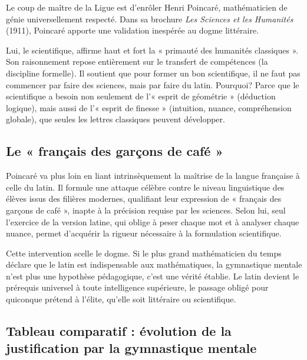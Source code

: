 Le coup de maître de la Ligue est d'enrôler Henri Poincaré, mathématicien de génie universellement
respecté. Dans sa brochure \textit{Les Sciences et les Humanités} (1911), Poincaré apporte une
validation inespérée au dogme littéraire.\cite{I-1-3-ref17}

Lui, le scientifique, affirme haut et fort la « primauté des humanités classiques ». Son
raisonnement repose entièrement sur le transfert de compétences (la discipline formelle). Il
soutient que pour former un bon scientifique, il ne faut pas commencer par faire des sciences, mais
par faire du latin. Pourquoi? Parce que le scientifique a besoin non seulement de l'« esprit de
géométrie » (déduction logique), mais aussi de l'« esprit de finesse » (intuition, nuance,
compréhension globale), que seules les lettres classiques peuvent développer.\cite{I-1-3-ref17}



\subsection{Le « français des garçons de café »}

Poincaré va plus loin en liant intrinsèquement la maîtrise de la langue française à celle du latin.
Il formule une attaque célèbre contre le niveau linguistique des élèves issus des filières modernes,
qualifiant leur expression de « français des garçons de café », inapte à la précision requise par
les sciences. Selon lui, seul l'exercice de la version latine, qui oblige à peser chaque mot et à
analyser chaque nuance, permet d'acquérir la rigueur nécessaire à la formulation
scientifique.\cite{I-1-3-ref17}

Cette intervention scelle le dogme. Si le plus grand mathématicien du temps déclare que le latin est
indispensable aux mathématiques, la gymnastique mentale n'est plus une hypothèse pédagogique, c'est
une vérité établie. Le latin devient le prérequis universel à toute intelligence supérieure, le
passage obligé pour quiconque prétend à l'élite, qu'elle soit littéraire ou scientifique.



\subsection{Tableau comparatif : évolution de la justification par la gymnastique mentale}


